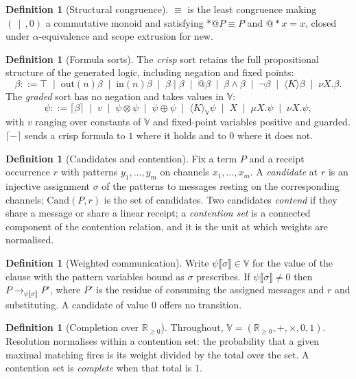 \documentclass[11pt,a4paper]{article}
\theoremstyle{plain}
\theoremstyle{definition}
\newtheorem{definition}[theorem]{Definition}
\theoremstyle{remark}
\newcommand{\sem}[1]{\llbracket #1 \rrbracket}
\newcommand{\V}{\mathbb{V}}
\newcommand{\Rnn}{\mathbb{R}_{\geq 0}}
\newcommand{\scong}{\equiv}
\newcommand{\tensorv}{\otimes}
\newcommand{\sumv}{\oplus}
\newcommand{\Cand}{\mathrm{Cand}}
\newcommand{\Out}{\mathrm{out}}
\newcommand{\crisp}[1]{\lceil #1 \rceil}
\begin{document}
\begin{definition}[Structural congruence]
$\scong$ is the least congruence making $(\,\mid\,, 0)$ a commutative monoid and
satisfying $*@P \scong P$ and $@*x = x$, closed under $\alpha$-equivalence and
scope extrusion for \textsf{new}.
\end{definition}

\begin{definition}[Formula sorts]\label{def:sorts}
The \emph{crisp} sort retains the full propositional structure of the
generated logic, including negation and fixed points:
\[
\beta ::= \top \;\mid\; \Out(n)\beta \;\mid\; \mathrm{in}(n)\beta
      \;\mid\; \beta \mid \beta \;\mid\; @\beta
      \;\mid\; \beta \wedge \beta \;\mid\; \neg\beta
      \;\mid\; \langle K\rangle\beta \;\mid\; \nu X.\beta .
\]
The \emph{graded} sort has no negation and takes values in $\V$:
\[
\psi ::= \crisp{\beta} \;\mid\; v \;\mid\; \psi \tensorv \psi
      \;\mid\; \psi \sumv \psi \;\mid\; \langle K\rangle_{\V}\psi
      \;\mid\; X \;\mid\; \mu X.\psi \;\mid\; \nu X.\psi ,
\]
with $v$ ranging over constants of $\V$ and fixed-point variables positive and
guarded. $\crisp{-}$ sends a crisp formula to $1$ where it holds and to $0$
where it does not.
\end{definition}

\begin{definition}[Candidates and contention]\label{def:cand}
Fix a term $P$ and a receipt occurrence $r$ with patterns $y_1,\dots,y_m$ on
channels $x_1,\dots,x_m$. A \emph{candidate} at $r$ is an injective assignment
$\sigma$ of the patterns to messages resting on the corresponding channels;
$\Cand(P,r)$ is the set of candidates. Two candidates \emph{contend} if they
share a message or share a linear receipt; a \emph{contention set} is a
connected component of the contention relation, and it is the unit at which
weights are normalised.
\end{definition}

\begin{definition}[Weighted communication]\label{def:comm}
Write $\psi\sem{\sigma} \in \V$ for the value of the clause with the pattern
variables bound as $\sigma$ prescribes. If $\psi\sem{\sigma} \neq 0$ then
$P \longrightarrow_{\psi\sem{\sigma}} P'$, where $P'$ is the residue of consuming
the assigned messages and $r$ and substituting. A candidate of value $0$ offers
no transition.
\end{definition}

\begin{definition}[Completion over $\Rnn$]\label{def:completion}
Throughout, $\V = (\Rnn,+,\times,0,1)$. Resolution normalises within a
contention set: the probability that a given maximal matching fires is its
weight divided by the total over the set. A contention set is \emph{complete}
when that total is $1$.
\end{definition}
\end{document}
